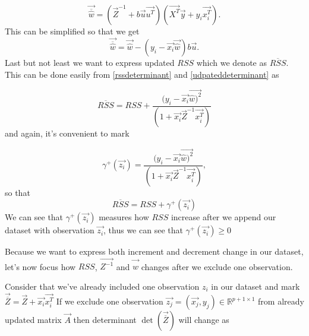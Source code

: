 \begin{equation}
    \vec{\overline{\hat{w}}} = (\vec{Z}^{-1} + b\vec{u}\vec{u^T})(\vec{X^T}\vec{y} + y_i\vec{x_i^T}).
\end{equation}
This can be simplified so that we get
\begin{equation} \label{thetaplus}
    \vec{\overline{\hat{w}}} = \vec{\hat{w}} - (y_i - \vec{x_i}\vec{\hat{w}})b\vec{u}.
\end{equation}
Last but not least we want to express updated $RSS$ which we denote as $\overline{RSS}$. This can be done easily from \ref{rssdeterminant} and \ref{udpateddeterminant} as 

\begin{equation}
    \overline{RSS} =  RSS + \dfrac{(y_i - \vec{x_i}\vec{\hat{w})^2}}{(1 + \vec{x_i}\vec{Z}^{-1}\vec{x_i^T})}
\end{equation}
and again, it's convenient to mark 

\begin{equation}
    \gamma^{+}(\vec{z_i}) = \dfrac{(y_i - \vec{x_i}\vec{\hat{w})^2}}{(1 + \vec{x_i}\vec{Z}^{-1}\vec{x_i^T})},
\end{equation}
so that 
\begin{equation}
    \overline{RSS} =  RSS + \gamma^{+}(\vec{z_i})
\end{equation}
We can see that $\gamma^{+}(\vec{z_i})$ measures how $RSS$ increase after we append our dataset with observation $\vec{z_i}$, thus we can see that $\gamma^{+}(\vec{z_i}) \geq 0$

Because we want to express both increment and decrement change in our dataset, let's now focus how $RSS$, $\vec{Z^{-1}}$ and $\vec{\hat{w}}$  changes after we exclude one observation. 

Consider that we've already included one observation $z_i$ in our dataset and mark $\vec{\overline{Z}} = \vec{Z} + \vec{x_i} \vec{x_i^T} $ If we exclude one observation $\vec{z_j} = (\vec{x_j}, y_j) \in \mathbb{R}^{p+1 \times 1} $ from already updated matrix $\vec{A}$ then determinant $\det(\vec{\overline{Z}})$  will change as

